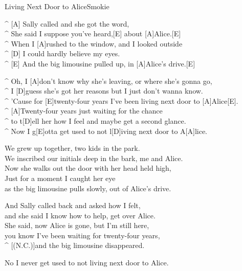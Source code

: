 \begin{song}{Living Next Door to Alice}{Smokie}


\begin{guitar}
^ [A] Sally called and she got the word,\\
^   She said I suppose you've heard,[E]  about [A]Alice.[E]\\
^ When I [A]rushed to the window, and I looked outside\\
^ [D] I could hardly believe my eyes.\\
^ [E] And the big limousine pulled up, in [A]Alice's drive.[E]\\
\end{guitar}

\begin{guitar}
^ Oh, I [A]don’t know why she's leaving, or where she's gonna go,\\
^ I [D]guess she's got her reasons but I just don’t wanna know.\\
^ 'Cause for [E]twenty-four years I’ve been living next door to [A]Alice[E].\\
^ [A]Twenty-four years just waiting for the chance\\
^ to t[D]ell her how I feel and maybe get a second glance.\\
^ Now I g[E]otta get used to not l[D]iving next door to A[A]lice.\\
\end{guitar}

\begin{guitar}
We grew up together, two kids in the park.\\
We inscribed our initials deep in the bark, me and Alice.\\
Now she walks out the door with her head held high,\\
Just for a moment I caught her eye\\
as the big limousine pulls slowly, out of Alice's drive.\\
\end{guitar}



\begin{guitar}
And Sally called back and asked how I felt,\\
and she said I know how to help, get over Alice.\\
She said, now Alice is gone, but I’m still here,\\
you know I’ve been waiting for twenty-four years,\\
^ [(N.C.)]and the big limousine disappeared.\\
\end{guitar}


\begin{guitar}
No I never get used to not living next door to Alice.\\
\end{guitar}

\end{song}
